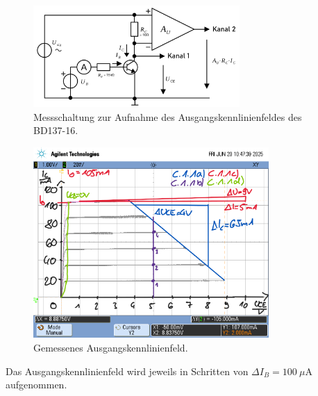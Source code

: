 \documentclass[
	a4paper, %
	12pt, %
]{CSUniSchoolLabReport}
\newcommand{\micro}{\ensuremath{\mu}}
\begin{document}
\begin{figure}[H]
	\centering
	\includegraphics[width=0.7\textwidth]{Figures/MessschaltungAusgangskennlinienfeld.png}
	\caption{Messschaltung zur Aufnahme des Ausgangskennlinienfeldes des BD137-16.}
	\label{fig:MessschaltungAusgangskennlinienfeld}
\end{figure}
\begin{figure}[H]
	\centering
	\includegraphics[width=0.8\textwidth]{Figures/Ausgangskennlinienfeld.png}
	\caption{Gemessenes Ausgangskennlinienfeld.}
	\label{fig:Ausgangskennlinienfeld}
\end{figure}

Das Ausgangskennlinienfeld wird jeweils in Schritten von $\Delta I_B = \SI{100}{\micro\ampere}$ aufgenommen.

\end{document}
